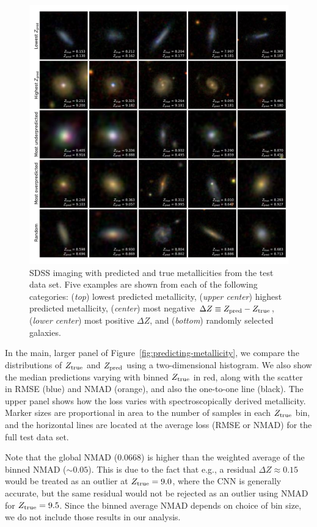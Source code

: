 \documentclass[fleqn,usenatbib]{mnras}
\begin{document}
\begin{figure}
	\includegraphics[width=\textwidth]{01-prediction_examples.pdf}
	\caption{\label{fig:examples}
		SDSS imaging with predicted and true metallicities from the test data set. 
		Five examples are shown from each of the following categories: (\textit{top}) lowest predicted metallicity, (\textit{upper center}) highest predicted metallicity, (\textit{center}) most negative $\Delta Z \equiv Z_{\rm pred} - Z_{\rm true}$, (\textit{lower center}) most positive $\Delta Z$, and (\textit{bottom}) randomly selected galaxies.}
\end{figure}



In the main, larger panel of Figure~\ref{fig:predicting-metallicity}, we compare the distributions of $Z_{\rm true}$ and $Z_{\rm pred}$ using a two-dimensional histogram.
We also show the median predictions varying with binned $Z_{\rm true}$ in red, along with the scatter in RMSE (blue) and NMAD (orange), and also the one-to-one line (black).
The upper panel shows how the loss varies with spectroscopically derived metallicity.
Marker sizes are proportional in area to the number of samples in each $Z_{\rm true}$ bin, and the horizontal lines are located at the average loss (RMSE or NMAD) for the full test data set.

Note that the global NMAD (0.0668) is higher than the weighted average of the binned NMAD ($\sim 0.05$).
This is due to the fact that e.g., a residual $\Delta Z \approx 0.15$ would be treated as an outlier at $Z_{\rm true} = 9.0$, where the CNN is generally accurate, but the same residual would not be rejected as an outlier using NMAD for $Z_{\rm true} = 9.5$.
Since the binned average NMAD depends on choice of bin size, we do not include those results in our analysis.
\end{document}
